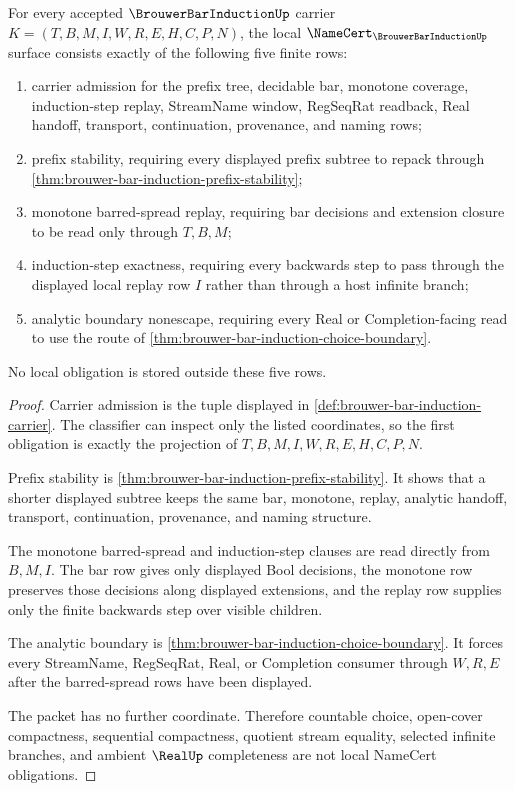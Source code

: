 \begin{theorem}
\label{thm:brouwer-bar-induction-namecert-obligations}
For every accepted $\BrouwerBarInductionUp$ carrier $K=(T,B,M,I,W,R,E,H,C,P,N)$, the local $\NameCert_{\BrouwerBarInductionUp}$ surface consists exactly of the following five finite rows:
\begin{enumerate}
\item carrier admission for the prefix tree, decidable bar, monotone coverage, induction-step replay, StreamName window, RegSeqRat readback, Real handoff, transport, continuation, provenance, and naming rows;
\item prefix stability, requiring every displayed prefix subtree to repack through \autoref{thm:brouwer-bar-induction-prefix-stability};
\item monotone barred-spread replay, requiring bar decisions and extension closure to be read only through $T,B,M$;
\item induction-step exactness, requiring every backwards step to pass through the displayed local replay row $I$ rather than through a host infinite branch;
\item analytic boundary nonescape, requiring every Real or Completion-facing read to use the route of \autoref{thm:brouwer-bar-induction-choice-boundary}.
\end{enumerate}
No local obligation is stored outside these five rows.
\end{theorem}
\begin{proof}
Carrier admission is the tuple displayed in \autoref{def:brouwer-bar-induction-carrier}. The classifier can inspect only the listed coordinates, so the first obligation is exactly the projection of $T,B,M,I,W,R,E,H,C,P,N$.

Prefix stability is \autoref{thm:brouwer-bar-induction-prefix-stability}. It shows that a shorter displayed subtree keeps the same bar, monotone, replay, analytic handoff, transport, continuation, provenance, and naming structure.

The monotone barred-spread and induction-step clauses are read directly from $B,M,I$. The bar row gives only displayed Bool decisions, the monotone row preserves those decisions along displayed extensions, and the replay row supplies only the finite backwards step over visible children.

The analytic boundary is \autoref{thm:brouwer-bar-induction-choice-boundary}. It forces every StreamName, RegSeqRat, Real, or Completion consumer through $W,R,E$ after the barred-spread rows have been displayed.

The packet has no further coordinate. Therefore countable choice, open-cover compactness, sequential compactness, quotient stream equality, selected infinite branches, and ambient $\RealUp$ completeness are not local NameCert obligations.
\end{proof}

